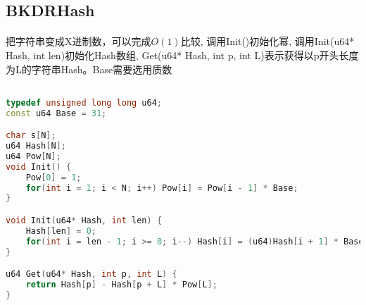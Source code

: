 ﻿\subsection{BKDRHash}
\paragraph{}
把字符串变成X进制数，可以完成$ O(1) $比较, 调用Init()初始化幂, 调用Init(u64* Hash, int len)初始化Hash数组, Get(u64* Hash, int p, int L)表示获得以p开头长度为L的字符串Hash。Base需要选用质数
\begin{lstlisting}[language=C++]

typedef unsigned long long u64;
const u64 Base = 31;

char s[N];
u64 Hash[N];
u64 Pow[N];
void Init() {
    Pow[0] = 1;
    for(int i = 1; i < N; i++) Pow[i] = Pow[i - 1] * Base;
}

void Init(u64* Hash, int len) {
    Hash[len] = 0;
    for(int i = len - 1; i >= 0; i--) Hash[i] = (u64)Hash[i + 1] * Base + (s[i] - 'a' + 1);
}

u64 Get(u64* Hash, int p, int L) {
    return Hash[p] - Hash[p + L] * Pow[L];
}
\end{lstlisting}